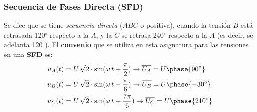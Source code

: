 \documentclass[11pt]{book} %
\begin{document}
	\subsubsection{Secuencia de Fases Directa (SFD)}
	
	Se dice que se tiene \textit{secuencia directa} ($ABC$ o positiva), cuando la tensión $B$ está retrasada 120$^\circ$ respecto a la $A$, y la $C$ se retrasa 240$^\circ$ respecto a la $A$ (es decir, se adelanta 120$^\circ$). El \textbf{convenio} que se utiliza en esta asignatura para las tensiones en una \textbf{SFD} es:
	\begin{align*}
		u_A(t)&=U\,\sqrt{2}\cdot \sin(\omega\, t+\frac{\pi}{2}) \rightarrow \overline{U_A}=U\phase {90^\circ}\\
		u_B(t)&=U\,\sqrt{2}\cdot \sin(\omega\, t-\frac{\pi}{6})\rightarrow \overline{U_B}=U\phase {-30^\circ}\\
		u_C(t)&=U\,\sqrt{2}\cdot \sin(\omega\,t+\frac{7\pi}{6}) \rightarrow \overline{U_C}=U\phase {210^\circ}
	\end{align*}
	
\end{document}
